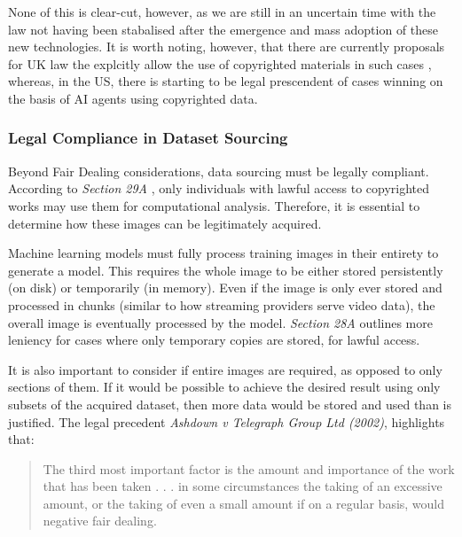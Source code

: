                   None of this is clear-cut, however, as we are still in an uncertain time with the law not having been stabalised after the emergence and mass adoption \cite{bick2024rapid} of these new technologies. It is worth noting, however, that there are currently proposals for UK law the explcitly allow the use of copyrighted materials in such cases \cite{guardian2024uk_ai_copyright}, whereas, in the US, there is starting to be legal prescendent of cases winning on the basis \cite{apnews2025thomson_reuters_ai_case} of AI agents using copyrighted data.
    
              \subsubsection{Legal Compliance in Dataset Sourcing}
    
                  Beyond Fair Dealing considerations, data sourcing must be legally compliant. According to \textit{Section 29A} \cite{cdpa1988}, only individuals with lawful access to copyrighted works may use them for computational analysis. Therefore, it is essential to determine how these images can be legitimately acquired.
    
                  Machine learning models must fully process training images in their entirety to generate a model. This requires the whole image to be either stored persistently (on disk) or temporarily (in memory). Even if the image is only ever stored and processed in chunks (similar to how streaming providers serve video data), the overall image is eventually processed by the model. \textit{Section 28A} outlines more leniency for cases where only temporary copies are stored, for lawful access.
    
                  It is also important to consider if entire images are required, as opposed to only sections of them. If it would be possible to achieve the desired result using only subsets of the acquired dataset, then more data would be stored and used than is justified. The legal precedent \textit{Ashdown v Telegraph Group Ltd (2002)}, highlights that:
    
                  \begin{quote}
                      The third most important factor is the amount and importance of the work that has been taken . . . in some circumstances the taking of an excessive amount, or the taking of even a small amount if on a regular basis, would negative fair dealing. \cite{tmlocad}
                  \end{quote}
    
